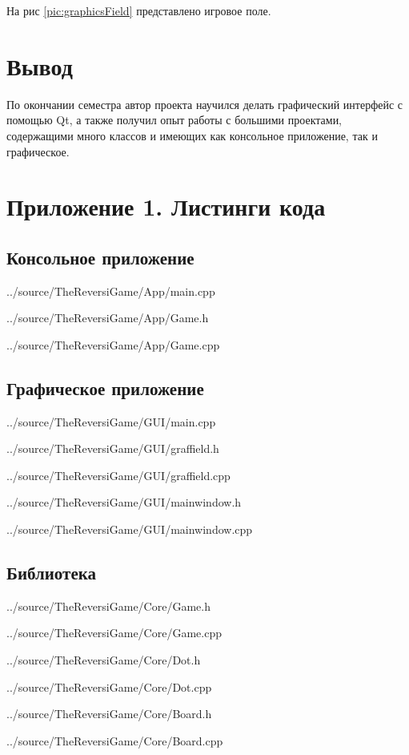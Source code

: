 \documentclass[a4paper]{article}
\begin{document}
На рис \ref{pic:graphicsField} представлено игровое поле.

\section{Вывод}
По окончании семестра автор проекта научился делать графический интерфейс с помощью Qt, а также получил опыт работы с большими проектами, содержащими много классов и имеющих как консольное приложение, так и графическое.

\section{Приложение 1. Листинги кода}
\subsection{Консольное приложение}

{../source/TheReversiGame/App/main.cpp}
\newpage


{../source/TheReversiGame/App/Game.h}

{../source/TheReversiGame/App/Game.cpp}
\newpage

\subsection{Графическое приложение}

{../source/TheReversiGame/GUI/main.cpp}
\newpage


{../source/TheReversiGame/GUI/graffield.h}

{../source/TheReversiGame/GUI/graffield.cpp}
\newpage


{../source/TheReversiGame/GUI/mainwindow.h}

{../source/TheReversiGame/GUI/mainwindow.cpp}
\newpage


\subsection{Библиотека}


{../source/TheReversiGame/Core/Game.h}

{../source/TheReversiGame/Core/Game.cpp}
\newpage


{../source/TheReversiGame/Core/Dot.h}

{../source/TheReversiGame/Core/Dot.cpp}
\newpage


{../source/TheReversiGame/Core/Board.h}

{../source/TheReversiGame/Core/Board.cpp}
\newpage
\end{document}
